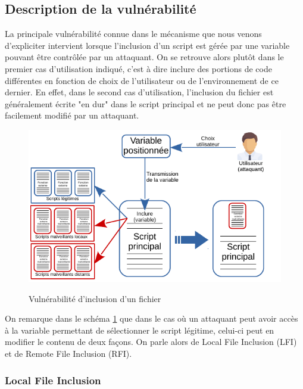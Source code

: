 \subsection{Description de la vulnérabilité}

La principale vulnérabilité connue dans le mécanisme que nous venons d'expliciter intervient lorsque l'inclusion d'un script est gérée par une variable pouvant être contrôlée par un attaquant. On se retrouve alors plutôt dans le premier cas d'utilisation indiqué, c'est à dire inclure des portions de code différentes en fonction de choix de l'utilisateur ou de l'environnement de ce dernier. En effet, dans le second cas d'utilisation, l'inclusion du fichier est généralement écrite "en dur" dans le script principal et ne peut donc pas être facilement modifié par un attaquant.

\begin{figure}[!h]
\begin{center}

\label{inclusion_hacked}
\includegraphics[scale=1.4]{images/include_hacked.pdf}

\caption{Vulnérabilité d'inclusion d'un fichier}

\end{center}
\end{figure}

On remarque dans le schéma \ref{inclusion_hacked} que dans le cas où un attaquant peut avoir accès à la variable permettant de sélectionner le script légitime, celui-ci peut en modifier le contenu de deux façons. On parle alors de Local File Inclusion (LFI) et de Remote File Inclusion (RFI).

\subsubsection{Local File Inclusion}

